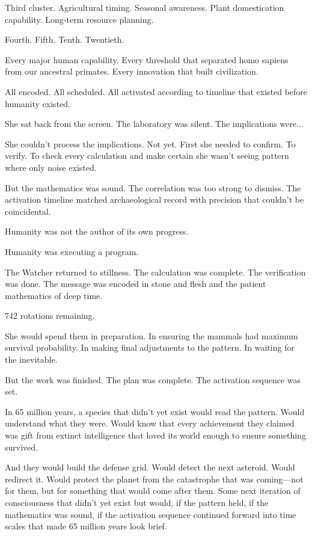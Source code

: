 Third cluster. Agricultural timing. Seasonal awareness. Plant domestication capability. Long-term resource planning.

Fourth. Fifth. Tenth. Twentieth.

Every major human capability. Every threshold that separated homo sapiens from our ancestral primates. Every innovation that built civilization.

All encoded. All scheduled. All activated according to timeline that existed before humanity existed.

She sat back from the screen. The laboratory was silent. The implications were...

She couldn't process the implications. Not yet. First she needed to confirm. To verify. To check every calculation and make certain she wasn't seeing pattern where only noise existed.

But the mathematics was sound. The correlation was too strong to dismiss. The activation timeline matched archaeological record with precision that couldn't be coincidental.

Humanity was not the author of its own progress.

Humanity was executing a program.

\scenebreak

The Watcher returned to stillness. The calculation was complete. The verification was done. The message was encoded in stone and flesh and the patient mathematics of deep time.

742 rotations remaining.

She would spend them in preparation. In ensuring the mammals had maximum survival probability. In making final adjustments to the pattern. In waiting for the inevitable.

But the work was finished. The plan was complete. The activation sequence was set.

In 65 million years, a species that didn't yet exist would read the pattern. Would understand what they were. Would know that every achievement they claimed was gift from extinct intelligence that loved its world enough to ensure something survived.

And they would build the defense grid. Would detect the next asteroid. Would redirect it. Would protect the planet from the catastrophe that was coming—not for them, but for something that would come after them. Some next iteration of consciousness that didn't yet exist but would, if the pattern held, if the mathematics was sound, if the activation sequence continued forward into time scales that made 65 million years look brief.

